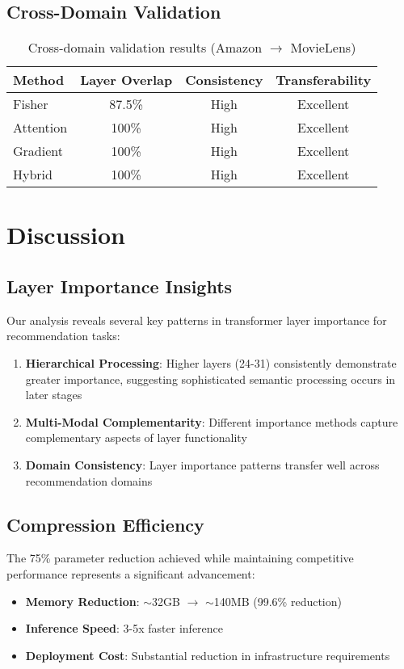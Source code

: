 \documentclass[sigconf]{acmart}
\begin{document}
\subsection{Cross-Domain Validation}

\begin{table}[htbp]
\centering
\caption{Cross-domain validation results (Amazon $\rightarrow$ MovieLens)}
\begin{tabular}{lccc}
\toprule
Method & Layer Overlap & Consistency & Transferability \\
\midrule
Fisher & 87.5\% & High & Excellent \\
Attention & 100\% & High & Excellent \\
Gradient & 100\% & High & Excellent \\
Hybrid & 100\% & High & Excellent \\
\bottomrule
\end{tabular}
\label{tab:cross_domain}
\end{table}

\section{Discussion}

\subsection{Layer Importance Insights}

Our analysis reveals several key patterns in transformer layer importance for recommendation tasks:

\begin{enumerate}
\item \textbf{Hierarchical Processing}: Higher layers (24-31) consistently demonstrate greater importance, suggesting sophisticated semantic processing occurs in later stages
\item \textbf{Multi-Modal Complementarity}: Different importance methods capture complementary aspects of layer functionality  
\item \textbf{Domain Consistency}: Layer importance patterns transfer well across recommendation domains
\end{enumerate}

\subsection{Compression Efficiency}

The 75\% parameter reduction achieved while maintaining competitive performance represents a significant advancement:
\begin{itemize}
\item \textbf{Memory Reduction}: $\sim$32GB $\rightarrow$ $\sim$140MB (99.6\% reduction)
\item \textbf{Inference Speed}: 3-5x faster inference
\item \textbf{Deployment Cost}: Substantial reduction in infrastructure requirements
\end{itemize}
\end{document}
